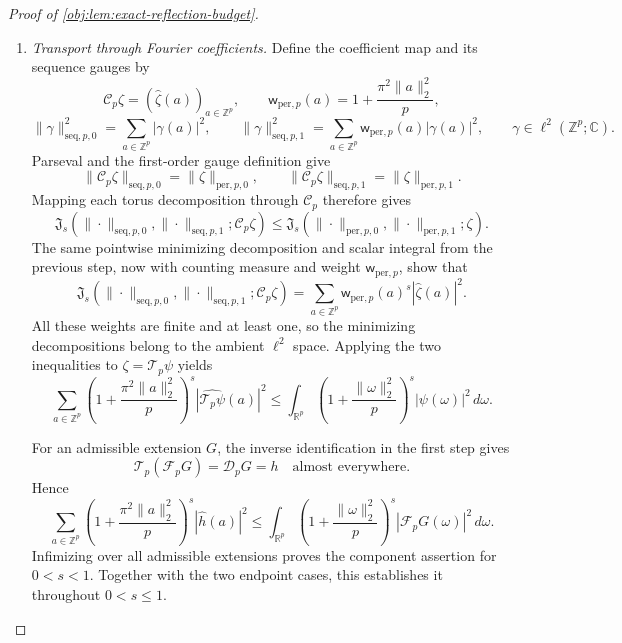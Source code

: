 \begin{proof}[Proof of \cref{obj:lem:exact-reflection-budget}]
\begin{enumerate}
\item \textit{Transport through Fourier coefficients.}
Define the coefficient map and its sequence gauges by
\[
\mathscr C_p\zeta=(\widehat\zeta(a))_{a\in\mathbb Z^p},
\qquad
\mathsf w_{\mathrm{per},p}(a)
=
1+\frac{\pi^2\|a\|_2^2}{p},
\]
\[
\|\gamma\|_{\mathrm{seq},p,0}^2
=
\sum_{a\in\mathbb Z^p}|\gamma(a)|^2,
\qquad
\|\gamma\|_{\mathrm{seq},p,1}^2
=
\sum_{a\in\mathbb Z^p}
\mathsf w_{\mathrm{per},p}(a)|\gamma(a)|^2,
\qquad \gamma\in\ell^2(\mathbb Z^p;\mathbb C).
\]
Parseval and the first-order gauge definition give
\[
\|\mathscr C_p\zeta\|_{\mathrm{seq},p,0}
=
\|\zeta\|_{\mathrm{per},p,0},
\qquad
\|\mathscr C_p\zeta\|_{\mathrm{seq},p,1}
=
\|\zeta\|_{\mathrm{per},p,1}.
\]
Mapping each torus decomposition through \(\mathscr C_p\) therefore gives
\[
\mathfrak J_s\!\left(
\|\cdot\|_{\mathrm{seq},p,0},
\|\cdot\|_{\mathrm{seq},p,1};
\mathscr C_p\zeta
\right)
\leq
\mathfrak J_s\!\left(
\|\cdot\|_{\mathrm{per},p,0},
\|\cdot\|_{\mathrm{per},p,1};
\zeta
\right).
\]
The same pointwise minimizing decomposition and scalar integral from the previous step, now with counting measure and weight
\(\mathsf w_{\mathrm{per},p}\), show that
\[
\mathfrak J_s\!\left(
\|\cdot\|_{\mathrm{seq},p,0},
\|\cdot\|_{\mathrm{seq},p,1};
\mathscr C_p\zeta
\right)
=
\sum_{a\in\mathbb Z^p}
\mathsf w_{\mathrm{per},p}(a)^s|\widehat\zeta(a)|^2.
\]
All these weights are finite and at least one, so the minimizing decompositions belong to the ambient \(\ell^2\) space. Applying the two inequalities to \(\zeta=\mathscr T_p\psi\) yields
\[
\sum_{a\in\mathbb Z^p}
\left(1+\frac{\pi^2\|a\|_2^2}{p}\right)^s
|\widehat{\mathscr T_p\psi}(a)|^2
\leq
\int_{\mathbb R^p}
\left(1+\frac{\|\omega\|_2^2}{p}\right)^s
|\psi(\omega)|^2\,d\omega.
\]

For an admissible extension \(G\), the inverse identification in the first step gives
\[
\mathscr T_p(\mathcal F_pG)=\mathscr D_pG=h
\quad\text{almost everywhere}.
\]
Hence
\[
\sum_{a\in\mathbb Z^p}
\left(1+\frac{\pi^2\|a\|_2^2}{p}\right)^s
|\widehat h(a)|^2
\leq
\int_{\mathbb R^p}
\left(1+\frac{\|\omega\|_2^2}{p}\right)^s
|\mathcal F_pG(\omega)|^2\,d\omega.
\]
Infimizing over all admissible extensions proves the component assertion for \(0<s<1\). Together with the two endpoint cases, this establishes it throughout \(0<s\leq1\).


\end{enumerate}
\end{proof}
